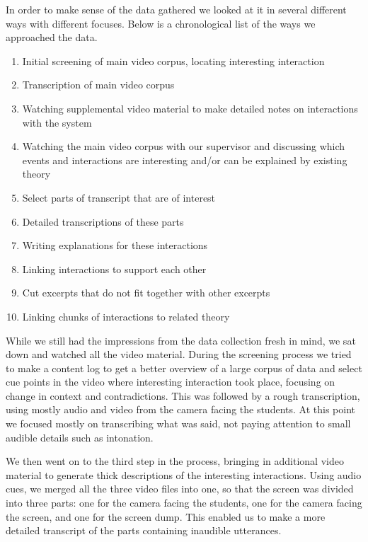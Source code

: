 In order to make sense of the data gathered we looked at it in several different ways with different focuses. Below is a chronological list of the ways we approached the data. 

\begin{enumerate}
\item{Initial screening of main video corpus, locating interesting interaction}
\item{Transcription of main video corpus}
\item{Watching supplemental video material to make detailed notes on interactions with the system}
\item{Watching the main video corpus with our supervisor and discussing which events and interactions are interesting and/or can be explained by existing theory}
\item{Select parts of transcript that are of interest}
\item{Detailed transcriptions of these parts}
\item{Writing explanations for these interactions}
\item{Linking interactions to support each other}
\item{Cut excerpts that do not fit together with other excerpts}
\item{Linking chunks of interactions to related theory}
\end{enumerate}

While we still had the impressions from the data collection fresh in mind, we sat down and watched all the video material. During the screening process we tried to make a content log to get a better overview of a large corpus of data and select cue points in the video where interesting interaction took place, focusing on change in context and contradictions. This was followed by a rough transcription, using mostly audio and video from the camera facing the students. At this point we focused mostly on transcribing what was said, not paying attention to small audible details such as intonation. 

We then went on to the third step in the process, bringing in additional video material to generate thick descriptions of the interesting interactions. Using audio cues, we merged all the three video files into one, so that the screen was divided into three parts: one for the camera facing the students, one for the camera facing the screen, and one for the screen dump. This enabled us to make a more detailed transcript of the parts containing inaudible utterances.


